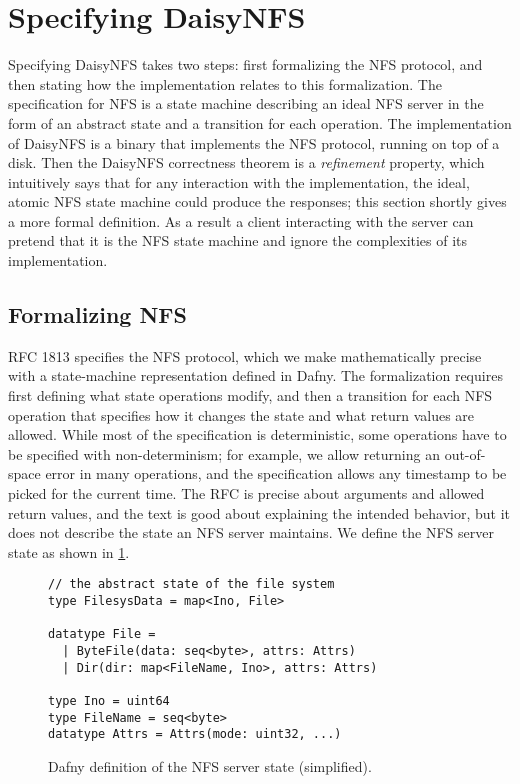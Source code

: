 \section{Specifying DaisyNFS}%
\label{sec:daisy:spec}

Specifying DaisyNFS takes two steps: first formalizing the NFS protocol, and
then stating how the implementation relates to this formalization.
The specification for NFS is a state machine describing an ideal NFS server in
the form of an abstract state and a transition for each operation. The
implementation of DaisyNFS is a binary  that implements the NFS
protocol, running on top of a
disk. Then the DaisyNFS correctness
theorem is a \emph{refinement} property, which intuitively says that
for any interaction with the
implementation, the ideal, atomic NFS state machine could produce the responses;
this section shortly gives a more formal definition.
As a result a client interacting with the server can pretend
that it is the NFS state machine and ignore the complexities of its
implementation.

\subsection{Formalizing NFS}%
\label{sec:daisy:nfs}

RFC 1813 specifies the NFS protocol, which we make mathematically precise with a
state-machine representation defined in Dafny.
The formalization requires first
defining what state operations modify, and then a transition for each
NFS operation that specifies how it changes the state and what return
values are allowed. While most of the specification is deterministic,
some operations have to be specified with non-determinism; for
example, we allow returning an out-of-space error in many operations,
and the specification allows any timestamp to be picked for the
current time. The RFC is precise about arguments and allowed return
values, and the text is good about explaining the intended behavior,
but it does not describe the state an NFS server maintains.  We define
the NFS server state as shown in \cref{fig:dafny-state}.

\begin{figure}[ht!]
\begin{small}
\begin{verbatim}
// the abstract state of the file system
type FilesysData = map<Ino, File>

datatype File =
  | ByteFile(data: seq<byte>, attrs: Attrs)
  | Dir(dir: map<FileName, Ino>, attrs: Attrs)

type Ino = uint64
type FileName = seq<byte>
datatype Attrs = Attrs(mode: uint32, ...)
\end{verbatim}
\end{small}
\caption{Dafny definition of the NFS server state (simplified).}
\label{fig:dafny-state}
\end{figure}


